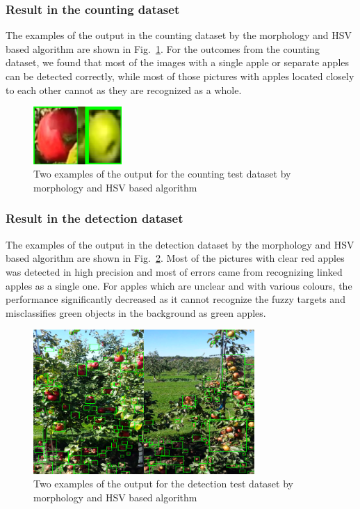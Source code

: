 \subsubsection{Result in the counting dataset}
The examples of the output in the counting dataset by the morphology and HSV based algorithm are shown in Fig.~\ref{fig:output in the counting dataset}. For the outcomes from the counting dataset, we found that most of the images with a single apple or separate apples can be detected correctly, while most of those pictures with apples located closely to each other cannot as they are recognized as a whole. 

\begin{figure}[htb]
    \centering
    \includegraphics[width=0.3\textwidth]{images/contours_outcome.png}
    \caption{Two examples of the output for the counting test dataset by morphology and HSV based algorithm}
    \label{fig:output in the counting dataset}
\end{figure}

\subsubsection{Result in the detection dataset}
The examples of the output in the detection dataset by the morphology and HSV based algorithm are shown in Fig.~\ref{fig:output in the detection dataset}. Most of the pictures with clear red apples was detected in high precision and most of errors came from recognizing linked apples as a single one. For apples which are unclear and with various colours, the performance significantly decreased as it cannot recognize the fuzzy targets and misclassifies green objects in the background as green apples.

\begin{figure}[htb]
    \centering
    \includegraphics[width=0.75\textwidth]{images/result_mor_detect.png}
    \caption{Two examples of the output for the detection test dataset by morphology and HSV based algorithm}
    \label{fig:output in the detection dataset}
\end{figure}

